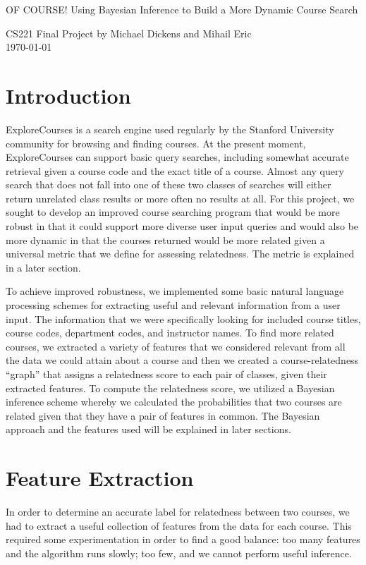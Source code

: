 \documentclass[12pt]{article}
\begin{document}
\begin{center}
{\Large OF COURSE! Using Bayesian Inference to Build a More Dynamic
  Course Search}

{\normalsize CS221 Final Project by Michael Dickens and Mihail Eric}\\
\today 
\end{center}


\section*{Introduction}
ExploreCourses is a search engine used regularly by the Stanford
University community for browsing and finding courses. At the present
moment, ExploreCourses can support basic query searches, including
somewhat accurate retrieval given a course code and the exact title of
a course. Almost any query search that does not fall into one of these
two classes of searches will either return unrelated class results or
more often no results at all. For this project, we sought to develop
an improved course searching program that would be more robust in that
it could support more diverse user input queries and would also be
more dynamic in that the courses returned would be more related
given a universal metric that we define for assessing relatedness. The
metric is explained in a later section.

To achieve improved robustness, we implemented some basic natural
language processing schemes for extracting useful and relevant
information from a user input. The information that we were
specifically looking for included course titles, course codes,
department codes, and instructor names. To find more related courses,
we extracted a variety of features that we considered relevant from
all the data we could attain about a course and then we created a
course-relatedness ``graph'' that assigns a relatedness score to each
pair of classes, given their extracted features. To compute the
relatedness score, we utilized a Bayesian inference scheme whereby we
calculated the probabilities that two courses are related given that
they have a pair of features in common. The Bayesian approach and the
features used will be explained in later sections.

\section*{Feature Extraction}
In order to determine an accurate label for relatedness
between two courses, we had to extract a useful collection of
features from the data for each course. This required some
experimentation in order to find a good balance: too many features and
the algorithm runs slowly; too few, and we cannot perform useful
inference.
\end{document}
